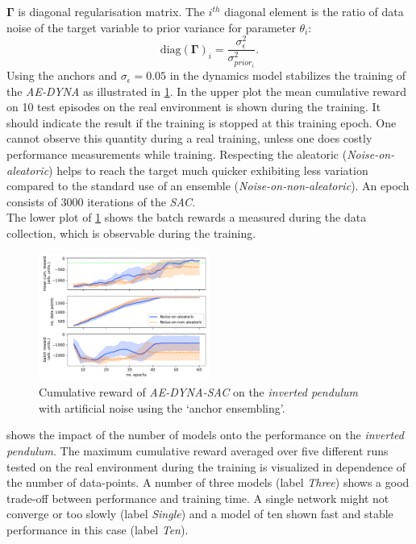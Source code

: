 \documentclass[
reprint,nofootinbib,
amsmath,amssymb,amsfonts,clevref,
aps,
prstab,
]{revtex4-2}
\begin{document}
	$\pmb{\Gamma}$ is diagonal regularisation matrix. The $i^{th}$ diagonal element is the ratio of data noise of the target variable to prior variance for parameter $\theta_i$:
	\begin{equation}
		\label{eqn_anch_loss_init}
		\text{diag}(\pmb{\Gamma})_i = \frac{\sigma^2_\epsilon}{\sigma^2_{prior_i}}.
	\end{equation}
	Using the anchors and $\sigma_\epsilon=0.05$ in the dynamics model stabilizes the training of the \emph{AE-DYNA} as illustrated in \cref{fig:comparsion_noise_ae_dyna}. In the upper plot the mean cumulative reward on 10 test episodes on the real environment is shown during the training. It should indicate the result if the training is stopped at this training epoch. One cannot observe this quantity during a real training, unless one does costly performance measurements while training. Respecting the aleatoric (\emph{Noise-on-aleatoric}) helps to reach the target much quicker exhibiting less variation compared to the standard use of an ensemble (\emph{Noise-on-non-aleatoric}). An epoch consists of 3000 iterations of the \emph{SAC}.\\
	The lower plot of \cref{fig:comparsion_noise_ae_dyna} shows the batch rewards a measured during the data collection, which is observable during the training.
	\begin{figure}[h]
		\centering
		\includegraphics*[width=0.5\textwidth]{Figures/Comparison_noise_ae_dyna}
		\caption{Cumulative reward of \emph{AE-DYNA-SAC} on the \emph{inverted pendulum} with artificial noise using the `anchor ensembling'.}
		\label{fig:comparsion_noise_ae_dyna}
	\end{figure}
	 shows the impact of the number of models onto the performance on the \emph{inverted pendulum}. The maximum cumulative reward averaged over five different runs tested on the real environment during the training is visualized in dependence of the number of data-points. A number of three models (label \emph{Three}) shows a good trade-off between performance and training time. A single network might not converge or too slowly (label \emph{Single}) and a model of ten shown fast and stable performance in this case (label \emph{Ten}).
\end{document}
